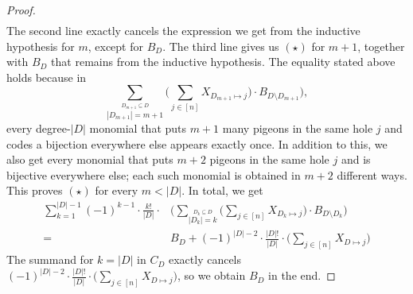 \documentclass[a4paper,UKenglish,cleveref, autoref, thm-restate]{lipics-v2021}
\begin{document}
\begin{proof}
\begin{align*}
	\end{align*}	
	The second line exactly cancels the expression we get from the inductive hypothesis for $m$, except for $B_D$. The third line gives us $(\star)$ for $m+1$, together with $B_D$ that remains from the inductive hypothesis. The equality stated above holds because in
	\[
	\sum_{\stackrel{D_{m+1} \subseteq D}{|D_{m+1}| = m+1}} \Big(\sum_{j \in [n]} X_{D_{m+1} \mapsto j}\Big) \cdot B_{D \setminus D_{m+1}} \Big),
	\]
	every degree-$|D|$ monomial that puts $m+1$ many pigeons in the same hole $j$ and codes a bijection everywhere else appears exactly once. In addition to this, we also get every monomial that puts $m+2$ pigeons in the same hole $j$ and is bijective everywhere else; each such monomial is obtained in $m+2$ different ways. This proves $(\star)$ for every $m < |D|$.
	In total, we get
	\begin{align*}
		\sum_{k=1}^{|D|-1} (-1)^{k-1} \cdot \frac{k!}{|D|} \cdot &\Big(\sum_{\stackrel{D_k \subseteq D}{|D_k| = k}} \Big(\sum_{j \in [n]} X_{D_k \mapsto j}\Big) \cdot B_{D \setminus D_k} \Big)\\
		= &B_D + (-1)^{|D|-2} \cdot \frac{|D|!}{|D|} \cdot \Big(\sum_{j \in [n]} X_{D \mapsto j}\Big)  
	\end{align*}	   
	The summand for $k = |D|$ in $C_D$ exactly cancels $(-1)^{|D|-2} \cdot \frac{|D|!}{|D|} \cdot \Big(\sum_{j \in [n]} X_{D \mapsto j}\Big)$, so we obtain $B_D$ in the end.
\end{proof}	
\end{document}
